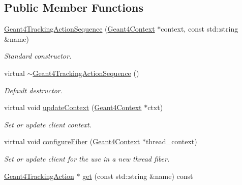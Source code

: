 \subsection*{Public Member Functions}
\begin{DoxyCompactItemize}
\item 
\hyperlink{class_d_d4hep_1_1_simulation_1_1_geant4_tracking_action_sequence_a9a85821d29760004065623d505a8d50a}{Geant4TrackingActionSequence} (\hyperlink{class_d_d4hep_1_1_simulation_1_1_geant4_context}{Geant4Context} $\ast$context, const std::string \&name)
\begin{DoxyCompactList}\small\item\em Standard constructor. \item\end{DoxyCompactList}\item 
virtual \hyperlink{class_d_d4hep_1_1_simulation_1_1_geant4_tracking_action_sequence_afa29770b5c1d47910c23dc3855244bcf}{$\sim$Geant4TrackingActionSequence} ()
\begin{DoxyCompactList}\small\item\em Default destructor. \item\end{DoxyCompactList}\item 
virtual void \hyperlink{class_d_d4hep_1_1_simulation_1_1_geant4_tracking_action_sequence_a7afac2362f030a76e39cbdc7ab5b0ee7}{updateContext} (\hyperlink{class_d_d4hep_1_1_simulation_1_1_geant4_context}{Geant4Context} $\ast$ctxt)
\begin{DoxyCompactList}\small\item\em Set or update client context. \item\end{DoxyCompactList}\item 
virtual void \hyperlink{class_d_d4hep_1_1_simulation_1_1_geant4_tracking_action_sequence_afff6a1aeeb049c8ee0ee2819d54b65d0}{configureFiber} (\hyperlink{class_d_d4hep_1_1_simulation_1_1_geant4_context}{Geant4Context} $\ast$thread\_\-context)
\begin{DoxyCompactList}\small\item\em Set or update client for the use in a new thread fiber. \item\end{DoxyCompactList}\item 
\hyperlink{class_d_d4hep_1_1_simulation_1_1_geant4_tracking_action}{Geant4TrackingAction} $\ast$ \hyperlink{class_d_d4hep_1_1_simulation_1_1_geant4_tracking_action_sequence_a484e57a9aabe9c6a8ededabbb633ba2d}{get} (const std::string \&name) const 

\end{DoxyCompactItemize}
